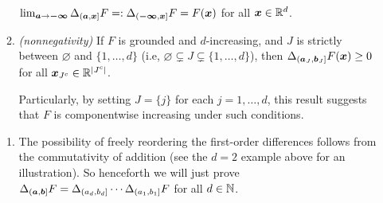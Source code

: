\begin{enumerate}
\begin{enumerate}
\(\lim_{\bm{a}\to\bm{-\infty}}\Delta_{(\bm{a},\bm{x}]}F=:\Delta_{(\bm{-\infty},\bm{x}]}F=F(\bm{x})\)
for all \(\bm{x}\in\mathbb{R}^d\).
\item\label{it:f-vol-nonneg} \emph{(nonnegativity)} If \(F\) is grounded and \(d\)-increasing, and
\(J\) is strictly between \(\varnothing\) and \(\{1,\dotsc,d\}\) (i.e,
\(\varnothing\subsetneq J\subsetneq \{1,\dotsc,d\}\)), then
\(\Delta_{(\bm{a}_{J},\bm{b}_{J}]}F(\bm{x})\ge 0\) for all
\(\bm{x}_{J^c}\in\mathbb{R}^{|J^c|}\).
\begin{note}
Particularly, by setting \(J=\{j\}\) for each \(j=1,\dotsc,d\), this result
suggests that \(F\) is componentwise increasing under such conditions.
\end{note}
\end{enumerate}
\begin{pf}
\begin{enumerate}
\item The possibility of freely reordering the first-order differences follows
from the commutativity of addition (see the \(d=2\) example above for an
illustration). So henceforth we will just prove \(\Delta_{(\bm{a},\bm{b}]}F
=\Delta_{(a_d,b_d]}\dotsb\Delta_{(a_1,b_1]}F\) for all \(d\in\mathbb{N}\).


\end{enumerate}
\end{pf}
\end{enumerate}
